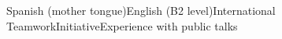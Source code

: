 Spanish (mother tongue)\spaced English (B2 level)\spaced International Teamwork\spaced Initiative\spaced Experience with public talks\,